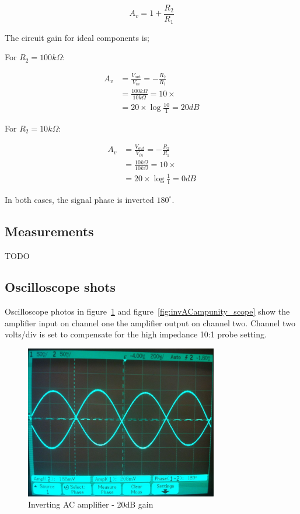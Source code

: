 \documentclass[11pt,a4paper]{article}
\begin{document}
\begin{equation}
    A_v = 1+\frac{R_2}{R_1}
\end{equation}

The circuit gain for ideal components is;

For $R_2 = 100k\Omega$:

\begin{align} 
A_v     &= \frac{V_{out}}{V_{in}} = -\frac{R_2}{R_1}\\
        &= \frac{100k\Omega}{10k\Omega} = 10\times\\
        &= 20 \times \log{\frac{10}{1}} = 20dB  
\end{align}

For $R_2 = 10k\Omega$:

\begin{align} 
A_v     &= \frac{V_{out}}{V_{in}} = -\frac{R_2}{R_1}\\
        &= \frac{10k\Omega}{10k\Omega} = 10\times\\
        &= 20 \times \log{\frac{1}{1}} = 0dB  
\end{align}

In both cases, the signal phase is inverted $180^\circ$.


\subsection{Measurements}\label{invAC-measurements-1}
TODO

\subsection{Oscilloscope shots}\label{invAC-oscilloscope-shots}
Oscilloscope photos in figure~\ref{fig:invACamp20dB_scope} and
figure~\ref{fig:invACampunity_scope} show the amplifier input on channel one
the amplifier output on channel two.  Channel two volts/div is set to
compensate for the high impedance 10:1 probe setting. 

\begin{figure}[htbp]
    \centering
    \includegraphics[width=0.75\textwidth]{img/invACamp-x10.jpg}
    \caption{Inverting AC amplifier - 20dB gain}
    \label{fig:invACamp20dB_scope}
\end{figure}
\end{document}
